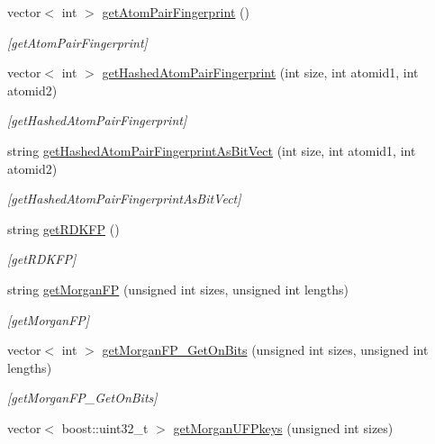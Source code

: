 \begin{DoxyCompactItemize}
vector$<$ int $>$ \mbox{\hyperlink{class_molecule_abfb8fda0aff9f7d749257badadd5d6d5}{get\+Atom\+Pair\+Fingerprint}} ()
\begin{DoxyCompactList}\small\item\em \mbox{[}get\+Atom\+Pair\+Fingerprint\mbox{]} \end{DoxyCompactList}\item 
vector$<$ int $>$ \mbox{\hyperlink{class_molecule_a12aeb95c7b163dd74d62cc6973d1197a}{get\+Hashed\+Atom\+Pair\+Fingerprint}} (int size, int atomid1, int atomid2)
\begin{DoxyCompactList}\small\item\em \mbox{[}get\+Hashed\+Atom\+Pair\+Fingerprint\mbox{]} \end{DoxyCompactList}\item 
string \mbox{\hyperlink{class_molecule_abc89b98816f2dc9666679cfb2e1eb696}{get\+Hashed\+Atom\+Pair\+Fingerprint\+As\+Bit\+Vect}} (int size, int atomid1, int atomid2)
\begin{DoxyCompactList}\small\item\em \mbox{[}get\+Hashed\+Atom\+Pair\+Fingerprint\+As\+Bit\+Vect\mbox{]} \end{DoxyCompactList}\item 
string \mbox{\hyperlink{class_molecule_ac60dca92ffb9d756a56b95af1a797022}{get\+R\+D\+K\+FP}} ()
\begin{DoxyCompactList}\small\item\em \mbox{[}get\+R\+D\+K\+FP\mbox{]} \end{DoxyCompactList}\item 
string \mbox{\hyperlink{class_molecule_a79d09ea8b999fe6ee10efbbdbee2dc54}{get\+Morgan\+FP}} (unsigned int sizes, unsigned int lengths)
\begin{DoxyCompactList}\small\item\em \mbox{[}get\+Morgan\+FP\mbox{]} \end{DoxyCompactList}\item 
vector$<$ int $>$ \mbox{\hyperlink{class_molecule_a1f719071d2a80ebe43599cd357767a19}{get\+Morgan\+F\+P\+\_\+\+Get\+On\+Bits}} (unsigned int sizes, unsigned int lengths)
\begin{DoxyCompactList}\small\item\em \mbox{[}get\+Morgan\+F\+P\+\_\+\+Get\+On\+Bits\mbox{]} \end{DoxyCompactList}\item 
vector$<$ boost\+::uint32\+\_\+t $>$ \mbox{\hyperlink{class_molecule_a51353115cdc974d1cf6b5d99bd9f5300}{get\+Morgan\+U\+F\+Pkeys}} (unsigned int sizes)

\end{DoxyCompactItemize}
